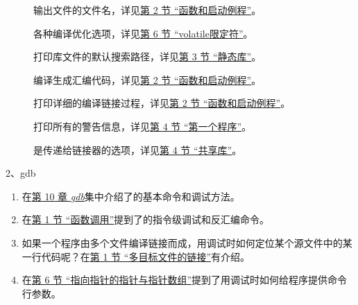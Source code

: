 \begin{description}
\item[{}]


输出文件的文件名，详见\hyperlink{db.ch19s02.id2776173}{第 2 节 “函数和启动例程”}。

\item[{}]


各种编译优化选项，详见\hyperlink{db.ch19s06.id2780234}{第 6 节 “volatile限定符”}。

\item[{}]


打印库文件的默认搜索路径，详见\hyperlink{db.ch20s03.id2789183}{第 3 节 “静态库”}。

\item[{}]


编译生成汇编代码，详见\hyperlink{db.ch19s02.id2776173}{第 2 节 “函数和启动例程”}。

\item[{}]


打印详细的编译链接过程，详见\hyperlink{db.ch19s02.id2776173}{第 2 节 “函数和启动例程”}。

\item[{}]


打印所有的警告信息，详见\hyperlink{db.intro.helloworld}{第 4 节 “第一个程序”}。

\item[{}]


是传递给链接器的选项，详见\hyperlink{db.ch20s04.id2789683}{第 4 节 “共享库”}。


\end{description}


2、gdb


\begin{enumerate}

\item 在\hyperlink{db.ch10.id2740153}{第 10 章 \emph{gdb}}集中介绍了的基本命令和调试方法。

\item 在\hyperlink{db.ch19s01.id2774377}{第 1 节 “函数调用”}提到了的指令级调试和反汇编命令。

\item 如果一个程序由多个文件编译链接而成，用调试时如何定位某个源文件中的某一行代码呢？在\hyperlink{db.ch20s01.id2786161}{第 1 节 “多目标文件的链接”}有介绍。

\item 在\hyperlink{db.ch23s06.id2812522}{第 6 节 “指向指针的指针与指针数组”}提到了用调试时如何给程序提供命令行参数。
\end{enumerate}


